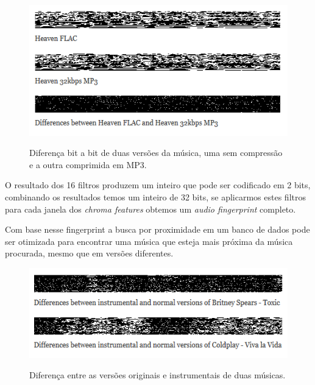 \begin{figure}[h]
\caption{\small Diferença bit a bit de duas versões da música, uma sem compressão e a outra comprimida em MP3.}
\centering
\includegraphics[scale=1]{figs/heavendifferences.png}
\label{f.chromaticn}
\end{figure}

O resultado dos 16 filtros produzem um inteiro que pode ser codificado em 2 bits, combinando os resultados temos um inteiro de 32 bits, se aplicarmos estes filtros para cada janela dos \emph{chroma features} obtemos um \emph{audio fingerprint} completo.

Com base nesse fingerprint a busca por proximidade em um banco de dados pode ser otimizada para encontrar uma música que esteja mais próxima da música procurada, mesmo que em versões diferentes.

\begin{figure}[h]
\caption{\small Diferença entre as versões originais e instrumentais de duas músicas.}
\centering
\includegraphics[scale=1]{figs/instrumental.png}
\label{f.chromaticn}
\end{figure}
